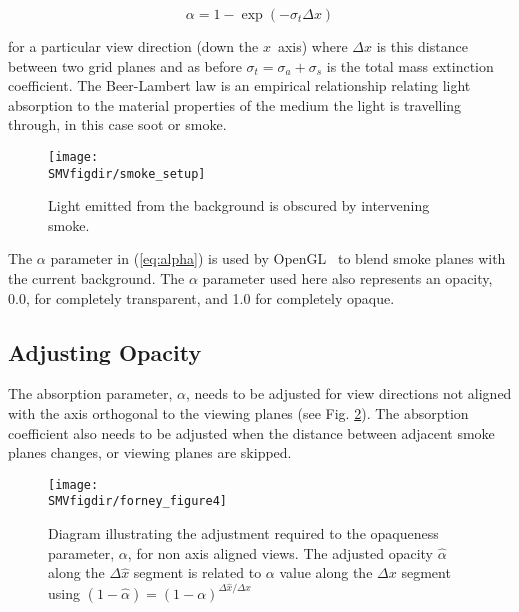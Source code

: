 {\begin{equation}
\label{eq:alpha}
\alpha=1-\exp(-\sigma_t\Delta x)
\end{equation}

\noindent for a particular view direction (down the $x$~axis)
where $\Delta x$ is this distance between two grid planes and as
before $\sigma_t=\sigma_a+\sigma_s$ is the total mass extinction
coefficient.  The Beer-Lambert law is an empirical relationship
relating light absorption to the material properties of the medium
the light is travelling through, in this case soot or smoke.

\begin{figure}[bph]
\begin{center}
\texttt{[image: \\SMVfigdir/smoke\_setup]}
\end{center}
\caption[Light emitted from the background is obscured by intervening smoke.]
{Light emitted from the background is obscured by intervening smoke.
}
\label{figsmokesetup}
\end{figure}

The $\alpha$ parameter in (\ref{eq:alpha}) is used by
OpenGL~\cite{OpenGLRed} to blend smoke planes with the current
background.  The $\alpha$ parameter used here also represents an
opacity, 0.0, for completely transparent, and 1.0 for completely
opaque.


\subsection{Adjusting Opacity}

The absorption parameter, $\alpha$, needs to be adjusted for view
directions not aligned with the axis orthogonal to the viewing
planes (see Fig. \ref{figray}).  The absorption coefficient also
needs to be adjusted when the distance between adjacent smoke
planes changes, or viewing planes are skipped.

\begin{figure}[bph]
\centerline{\texttt{[image: \\SMVfigdir/forney\_figure4]}}
\caption [Diagram illustrating the adjustment required to the
opaqueness parameter, $\alpha$, for non-axis aligned views.] {
Diagram illustrating the adjustment required to the opaqueness
parameter, $\alpha$, for non axis aligned views. The adjusted
opacity $\hat{\alpha}$ along the $\Delta\hat{x}$ segment is
related to $\alpha$ value along the $\Delta x$ segment using
$(1-\hat{\alpha})=(1-\alpha)^{\Delta \hat{x}/\Delta x}$}
\label{figray}
\end{figure}

}
